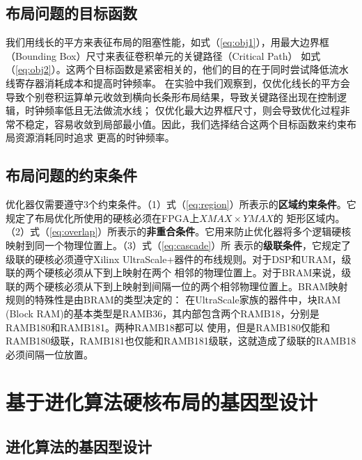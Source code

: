 \subsection{布局问题的目标函数}
我们用线长的平方来表征布局的阻塞性能，如式（\ref{eq:obj1}），用最大边界框（Bounding Box）尺寸来表征卷积单元的关键路径（Critical Path）
如式（\ref{eq:obj2}）。这两个目标函数是紧密相关的，他们的目的在于同时尝试降低流水线寄存器消耗成本和提高时钟频率。
在实验中我们观察到，仅优化线长的平方会导致个别卷积运算单元收敛到横向长条形布局结果，导致关键路径出现在控制逻辑，时钟频率低且无法做流水线；
仅优化最大边界框尺寸，则会导致优化过程非常不稳定，容易收敛到局部最小值。因此，我们选择结合这两个目标函数来约束布局资源消耗同时追求
更高的时钟频率。

\subsection{布局问题的约束条件}
优化器仅需要遵守3个约束条件。（1）式（\ref{eq:region}）所表示的{\bf 区域约束条件}。它规定了布局优化所使用的硬核必须在FPGA上$XMAX \times YMAX$的
矩形区域内。（2）式（\ref{eq:overlap}）所表示的{\bf 非重合条件}。它用来防止优化器将多个逻辑硬核映射到同一个物理位置上。（3）式（\ref{eq:cascade}）所
表示的{\bf 级联条件}，它规定了级联的硬核必须遵守Xilinx UltraScale+器件的布线规则。对于DSP和URAM，级联的两个硬核必须从下到上映射在两个
相邻的物理位置上。对于BRAM来说，级联的两个硬核必须从下到上映射到间隔一位的两个相邻物理位置上。BRAM映射规则的特殊性是由BRAM的类型决定的：
在UltraScale家族的器件中，块RAM (Block RAM)的基本类型是RAMB36，其内部包含两个RAMB18，分别是RAMB180和RAMB181。两种RAMB18都可以
使用，但是RAMB180仅能和RAMB180级联，RAMB181也仅能和RAMB181级联，这就造成了级联的RAMB18必须间隔一位放置。


\section{基于进化算法硬核布局的基因型设计}

\subsection{进化算法的基因型设计}

